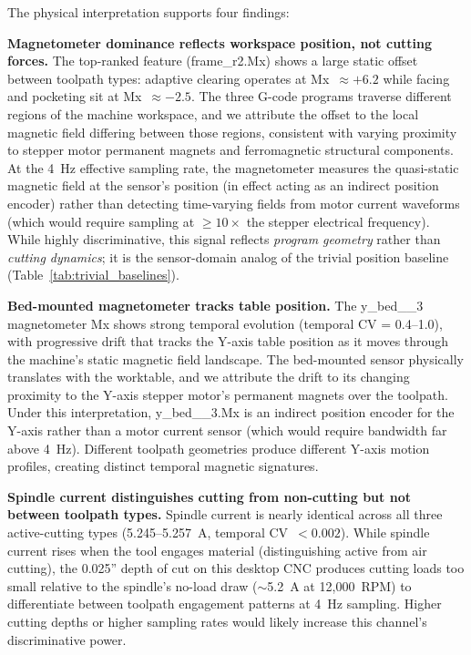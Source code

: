 The physical interpretation supports four findings:

\textbf{Magnetometer dominance reflects workspace position, not cutting forces.} The top-ranked feature (frame\_r2.Mx) shows a large static offset between toolpath types: adaptive clearing operates at Mx~$\approx +6.2$ while facing and pocketing sit at Mx~$\approx -2.5$. The three G-code programs traverse different regions of the machine workspace, and we attribute the offset to the local magnetic field differing between those regions, consistent with varying proximity to stepper motor permanent magnets and ferromagnetic structural components. At the \SI{4}{\hertz} effective sampling rate, the magnetometer measures the quasi-static magnetic field at the sensor's position (in effect acting as an indirect position encoder) rather than detecting time-varying fields from motor current waveforms (which would require sampling at $\geq 10\times$ the stepper electrical frequency). While highly discriminative, this signal reflects \emph{program geometry} rather than \emph{cutting dynamics}; it is the sensor-domain analog of the trivial position baseline (Table~\ref{tab:trivial_baselines}).

\textbf{Bed-mounted magnetometer tracks table position.} The y\_bed\_\_3 magnetometer Mx shows strong temporal evolution (temporal CV = 0.4--1.0), with progressive drift that tracks the Y-axis table position as it moves through the machine's static magnetic field landscape. The bed-mounted sensor physically translates with the worktable, and we attribute the drift to its changing proximity to the Y-axis stepper motor's permanent magnets over the toolpath. Under this interpretation, y\_bed\_\_3.Mx is an indirect position encoder for the Y-axis rather than a motor current sensor (which would require bandwidth far above \SI{4}{\hertz}). Different toolpath geometries produce different Y-axis motion profiles, creating distinct temporal magnetic signatures.

\textbf{Spindle current distinguishes cutting from non-cutting but not between toolpath types.} Spindle current is nearly identical across all three active-cutting types (5.245--5.257~A, temporal CV~$< 0.002$). While spindle current rises when the tool engages material (distinguishing active from air cutting), the 0.025'' depth of cut on this desktop CNC produces cutting loads too small relative to the spindle's no-load draw ($\sim$5.2~A at 12{,}000~RPM) to differentiate between toolpath engagement patterns at 4~Hz sampling. Higher cutting depths or higher sampling rates would likely increase this channel's discriminative power.


